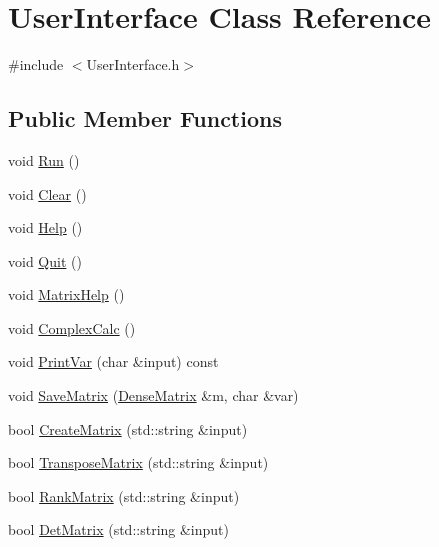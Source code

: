\hypertarget{class_user_interface}{}\section{User\+Interface Class Reference}
\label{class_user_interface}


{\ttfamily \#include $<$User\+Interface.\+h$>$}

\subsection*{Public Member Functions}
\begin{DoxyCompactItemize}
\item 
void \mbox{\hyperlink{class_user_interface_a63387b09d5225cfeb5c76582a6131b6c}{Run}} ()
\item 
void \mbox{\hyperlink{class_user_interface_a82de92f26f83e2ecaffa1c6ebd8accdb}{Clear}} ()
\item 
void \mbox{\hyperlink{class_user_interface_a011662c4d62cf2ee170b151f8c9ae522}{Help}} ()
\item 
void \mbox{\hyperlink{class_user_interface_a1b3e14c742df39d1da1c9bcb67797afb}{Quit}} ()
\item 
void \mbox{\hyperlink{class_user_interface_af85f52822f67c39feef07d7efe5d64ca}{Matrix\+Help}} ()
\item 
void \mbox{\hyperlink{class_user_interface_a446c2436cb7b4743317307d9afc9b779}{Complex\+Calc}} ()
\item 
void \mbox{\hyperlink{class_user_interface_af2f9a9e8ef0e73d709d2dd2969d7d777}{Print\+Var}} (char \&input) const
\item 
void \mbox{\hyperlink{class_user_interface_a481ef0dc164fa83707699300d7d8b723}{Save\+Matrix}} (\mbox{\hyperlink{class_dense_matrix}{Dense\+Matrix}} \&m, char \&var)
\item 
bool \mbox{\hyperlink{class_user_interface_a3c681f0d9a46f4dde3df29066e68c3a9}{Create\+Matrix}} (std\+::string \&input)
\item 
bool \mbox{\hyperlink{class_user_interface_a99111fb99085efacd054e8c2e00f694b}{Transpose\+Matrix}} (std\+::string \&input)
\item 
bool \mbox{\hyperlink{class_user_interface_ad0bb8a04c4f0f719bbe132da5bcdb4cd}{Rank\+Matrix}} (std\+::string \&input)
\item 
bool \mbox{\hyperlink{class_user_interface_a177531c4687cffac01991749df5ad98a}{Det\+Matrix}} (std\+::string \&input)
\item 

\end{DoxyCompactItemize}
